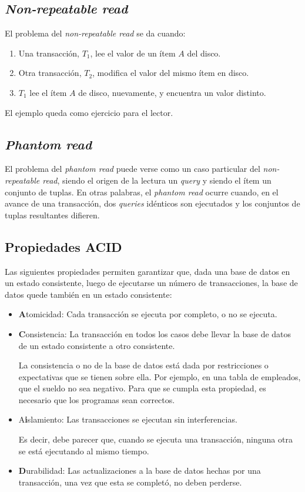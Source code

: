 \documentclass[english]{article}
\theoremstyle{definition}
\theoremstyle{definition}
\begin{document}
\subsection{\emph{Non-repeatable read}}

El problema del \emph{non-repeatable read} se da cuando:
\begin{enumerate}
    \item Una transacción, $T_1$, lee el valor de un ítem $A$ del disco.
    \item Otra transacción, $T_2$, modifica el valor del mismo ítem en disco.
    \item $T_1$ lee el ítem $A$ de disco, nuevamente, y encuentra un valor
        distinto.
\end{enumerate}

El ejemplo queda como ejercicio para el lector. 

\subsection{\emph{Phantom read}}

El problema del \emph{phantom read} puede verse como un caso particular del
\emph{non-repeatable read}, siendo el origen de la lectura un \emph{query} y
siendo el ítem un conjunto de tuplas. En otras palabras, el
\emph{phantom read} ocurre cuando, en el avance de una transacción, dos
\emph{queries} idénticos son ejecutados y los conjuntos de tuplas resultantes
difieren.

\subsection{Propiedades ACID}

Las siguientes propiedades permiten garantizar que, dada una base de datos en
un estado consistente, luego de ejecutarse un número de transacciones, la base
de datos quede también en un estado consistente:

\begin{itemize}
    \item \textbf{A}tomicidad: Cada transacción se ejecuta por completo, o no
        se ejecuta.
    \item \textbf{C}onsistencia: La transacción en todos los casos debe llevar
        la base de datos de un estado consistente a otro consistente.
        
        La consistencia o no de la base de datos está dada por restricciones o
        expectativas que se tienen sobre ella. Por ejemplo, en una tabla de
        empleados, que el sueldo no sea negativo. Para que se cumpla esta
        propiedad, es necesario que los programas sean correctos.
    \item A\textbf{i}slamiento: Las transacciones se ejecutan sin
        interferencias.

        Es decir, debe parecer que, cuando se ejecuta una transacción, ninguna
        otra se está ejecutando al mismo tiempo.
    \item \textbf{D}urabilidad: Las actualizaciones a la base de datos hechas
        por una transacción, una vez que esta se completó, no deben perderse.
\end{itemize}
\end{document}
